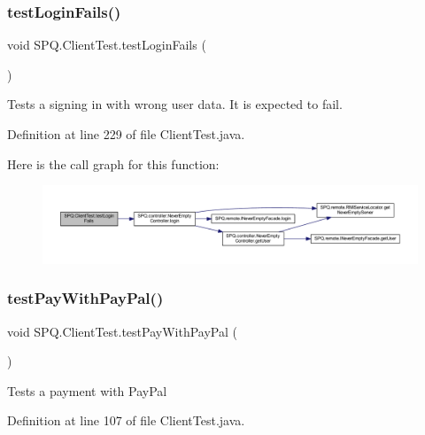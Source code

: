 \subsubsection{\texorpdfstring{test\+Login\+Fails()}{testLoginFails()}}
{\footnotesize\ttfamily void S\+P\+Q.\+Client\+Test.\+test\+Login\+Fails (\begin{DoxyParamCaption}{ }\end{DoxyParamCaption})}

Tests a signing in with wrong user data. It is expected to fail. 

Definition at line 229 of file Client\+Test.\+java.

Here is the call graph for this function\+:
\nopagebreak
\begin{figure}[H]
\begin{center}
\leavevmode
\includegraphics[width=350pt]{class_s_p_q_1_1_client_test_ac05d043ac92f1c1083d19eec58e5bbd9_cgraph}
\end{center}
\end{figure}
\mbox{\label{class_s_p_q_1_1_client_test_afe92931ed84ed471c853004681be4072}} 
\subsubsection{\texorpdfstring{test\+Pay\+With\+Pay\+Pal()}{testPayWithPayPal()}}
{\footnotesize\ttfamily void S\+P\+Q.\+Client\+Test.\+test\+Pay\+With\+Pay\+Pal (\begin{DoxyParamCaption}{ }\end{DoxyParamCaption})}

Tests a payment with Pay\+Pal 

Definition at line 107 of file Client\+Test.\+java.

